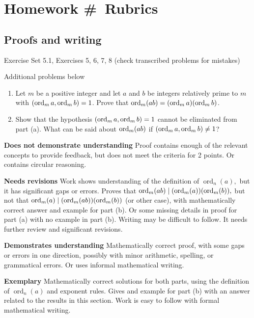 \documentclass[letterpaper, 11pt]{../ximera}
\begin{document}
\chapter{Homework \#\homework\ Rubrics}

\section*{Proofs and writing}  %
Exercise Set 5.1, Exercises 5, 6, 7, 8 (check transcribed problems for mistakes)

\noindent Additional problems below

\begin{ex} 
	\begin{enumerate}[label=(\alph*)]
 		\item\label{order_mult} Let $m$ be a positive integer and let $a$ and $b$ be integers relatively prime to $m$ with $(\operatorname{ord}_m a, \operatorname{ord}_m b)=1$. Prove that $\operatorname{ord}_m(ab)=(\operatorname{ord}_m a)(\operatorname{ord}_m b)$.
		\item Show that the hypothesis $(\operatorname{ord}_m a, \operatorname{ord}_m b)=1$ cannot be eliminated from part (a). What can be said about $\operatorname{ord}_m(ab)$ if $(\operatorname{ord}_m a, \operatorname{ord}_m b)\neq1$?
	\end{enumerate}
 
\end{ex}	

\begin{writeRubric}
    \item \textbf{Does not demonstrate understanding}
     Proof contains enough of the relevant concepts to provide feedback, but does not meet the criteria for 2 points. Or contains circular reasoning.
    \item \textbf{Needs revisions}
    Work shows understanding of the definition of $\operatorname{ord}_n(a),$ but it has significant gaps or errors. Proves that $\operatorname{ord}_m(ab)\mid(\operatorname{ord}_m(a))(\operatorname{ord}_m(b)),$ but not that $\operatorname{ord}_m(a)\mid(\operatorname{ord}_m(ab))(\operatorname{ord}_m(b))$ (or other case), with mathematically correct answer and example for part (b). Or some missing details in proof for part (a) with no example in part (b). Writing may be difficult to follow. It needs further review and significant revisions.
     
    \item \textbf{Demonstrates understanding}
    Mathematically correct proof, with some gaps or errors in one direction, possibly with minor arithmetic, spelling, or grammatical errors. Or uses informal mathematical writing.
    
    \item \textbf{Exemplary} Mathematically correct solutions for both parts, using the definition of $\operatorname{ord}_n(a)$ and exponent rules. Gives and example for part (b) with an answer related to the results in this section. Work is easy to follow with formal mathematical writing.
        
\end{writeRubric}
                                       	
\end{document}
